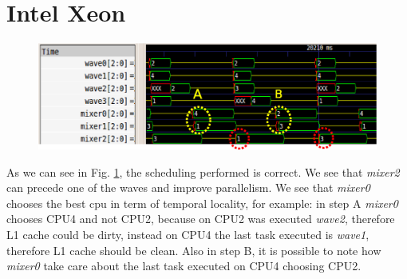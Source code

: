 \section{Intel Xeon}

\begin{figure}[htbp]
\centering
\includegraphics[width=\widefigure]{images/results_xeon/final_xeon.eps}
\caption{}
\label{fig:final_xeon}
\end{figure}

As we can see in Fig. \ref{fig:final_xeon}, the scheduling performed is correct. We see that \textit{mixer2} can precede one of the waves and improve 
parallelism. We see that \textit{mixer0} chooses the best cpu in term of temporal locality, for example: in step A \textit{mixer0} chooses CPU4 and not 
CPU2, because on CPU2 was executed \textit{wave2}, therefore L1 cache could be dirty, instead on CPU4 the last task executed is \textit{wave1}, therefore 
L1 cache should be clean. Also in step B, it is possible to note how \textit{mixer0} take care about the last task executed on CPU4 choosing CPU2.

